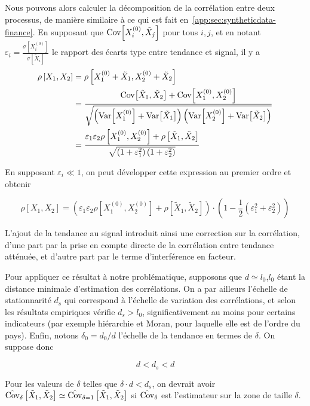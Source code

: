 Nous pouvons alors calculer la décomposition de la corrélation entre deux processus, de manière similaire à ce qui est fait en~\ref{app:sec:syntheticdata-finance}. En supposant que $\operatorname{Cov}\!\left[X_i^{(0)},\tilde{X}_j\right]$ pour tous $i,j$, et en notant $\varepsilon_i = \frac{\sigma\left[X_i^{(0)}\right]}{\sigma\left[\tilde{X}_i\right]}$ le rapport des écarts type entre tendance et signal, il y a
\[
\begin{split}
	\rho\left[X_1,X_2\right] & = \rho\left[X_1^{(0)} + \tilde{X}_1,X_2^{(0)} + \tilde{X}_2\right]\\
	& = \frac{\operatorname{Cov}\!\left[\tilde{X}_1,\tilde{X}_2\right] + \operatorname{Cov}\!\left[X_1^{(0)},X_2^{(0)}\right]}{\sqrt{\left(\operatorname{Var}\!\left[X_1^{(0)}\right] + \operatorname{Var}\!\left[\tilde{X}_1\right]\right)\left(\operatorname{Var}\!\left[X_2^{(0)}\right] + \operatorname{Var}\!\left[\tilde{X}_2\right]\right)}}\\
	& = \frac{\varepsilon_1 \varepsilon_2\rho\left[X_1^{(0)},X_2^{(0)}\right] + \rho\left[\tilde{X}_1,\tilde{X}_2\right]}{\sqrt{\left(1 + \varepsilon_1^2\right)\left(1 + \varepsilon_2^2\right)}}
\end{split}
\]

En supposant $\varepsilon_i \ll 1$, on peut développer cette expression au premier ordre et obtenir

\begin{equation}
	\rho\left[X_1,X_2\right] = \left( \varepsilon_1 \varepsilon_2\rho\left[X_1^{(0)},X_2^{(0)}\right] + \rho\left[\tilde{X}_1,\tilde{X}_2\right]\right)\cdot\left(1 - \frac{1}{2}(\varepsilon_1^2 + \varepsilon_2^2)\right)
\end{equation}

L'ajout de la tendance au signal introduit ainsi une correction sur la corrélation, d'une part par la prise en compte directe de la corrélation entre tendance atténuée, et d'autre part par le terme d'interférence en facteur.

Pour appliquer ce résultat à notre problématique, supposons que $d \simeq l_0$,$l_0$ étant la distance minimale d'estimation des corrélations. On a par ailleurs l'échelle de stationnarité $d_s$ qui correspond à l'échelle de variation des corrélations, et selon les résultats empiriques vérifie $d_s > l_0$, significativement au moins pour certains indicateurs (par exemple hiérarchie et Moran, pour laquelle elle est de l'ordre du pays). Enfin, notons $\delta_0 = d_0/d$ l'échelle de la tendance en termes de $\delta$. On suppose donc

\[
d < d_s < d
\]

Pour les valeurs de $\delta$ telles que $\delta \cdot d < d_s$, on devrait avoir $\hat{\operatorname{Cov}}_{\delta}\left[\tilde{X}_1,\tilde{X}_2\right] \simeq \hat{\operatorname{Cov}}_{\delta = 1}\left[\tilde{X}_1,\tilde{X}_2\right]$ si $\hat{\operatorname{Cov}}_{\delta}$ est l'estimateur sur la zone de taille $\delta$.


